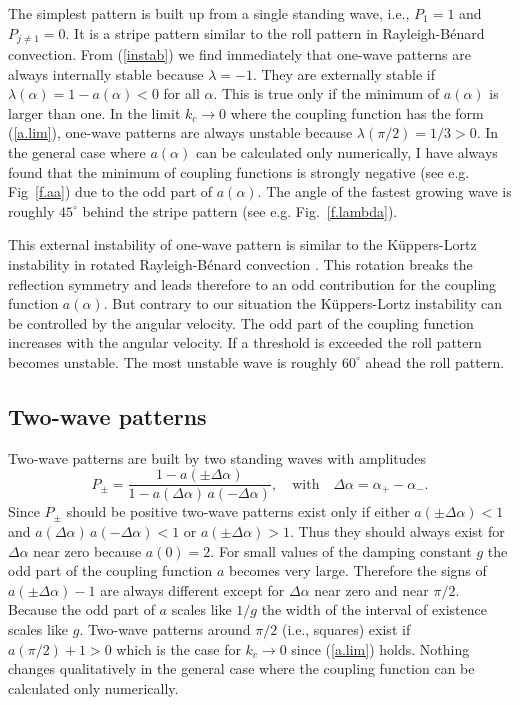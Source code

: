 The simplest pattern is built up from a single standing wave, i.e.,
$P_1=1$ and $P_{j\not=1}=0$. It is a stripe pattern similar to the
roll pattern in Rayleigh-B\'enard convection. From (\ref{instab}) we
find immediately that one-wave patterns are always internally stable 
because $\lambda=-1$. They are externally stable if
$\lambda(\alpha)=1-a(\alpha)<0$ for all $\alpha$. This is true only
if the minimum of $a(\alpha)$ is larger than one. In the limit
$k_c\to 0$ where the coupling function has the form (\ref{a.lim}),
one-wave patterns are always unstable because $\lambda(\pi/2)=1/3>0$.
In the general case where $a(\alpha)$ can be calculated only
numerically, I have always found that the minimum of coupling
functions is strongly negative (see e.g. Fig~\ref{f.aa}) due to the
odd part of $a(\alpha)$. The angle of the fastest growing wave is
roughly $45^\circ$ behind the stripe pattern (see e.g.
Fig.~\ref{f.lambda}).

This external instability of one-wave pattern is similar to the
K\"uppers-Lortz instability in rotated Rayleigh-B\'enard convection
\cite{kue.69}. This rotation breaks the reflection symmetry and
leads therefore to an odd contribution for the coupling function
$a(\alpha)$. But contrary to our situation the K\"uppers-Lortz
instability can be controlled by the angular velocity. The odd part
of the coupling function increases with the angular velocity. If a
threshold is exceeded the roll pattern becomes unstable. The most
unstable wave is roughly $60^\circ$ ahead the roll pattern.

\subsection{\protect\label{wave2}Two-wave patterns}

Two-wave patterns are built by two standing waves with amplitudes
\begin{equation}
  P_\pm=\frac{1-a(\pm\Delta\alpha)}{1-a(\Delta\alpha)\,a(-\Delta
   \alpha)},   \quad\mbox{with}\quad\Delta\alpha=\alpha_+-\alpha_-.
  \label{2wave}
\end{equation}
Since $P_\pm$ should be positive two-wave patterns exist only if
either $a(\pm\Delta\alpha)<1$ and $a(\Delta\alpha)\,
a(-\Delta\alpha)<1$ or $a(\pm\Delta\alpha)>1$. Thus they should
always exist for $\Delta\alpha$ near zero because $a(0)=2$. For small
values of the damping constant $g$ the odd part of the coupling
function $a$ becomes very large. Therefore the signs of
$a(\pm\Delta\alpha)-1$ are always different except for $\Delta\alpha$
near zero and near $\pi/2$. Because the odd part of $a$ scales like
$1/g$ the width of the interval of existence scales like $g$.
Two-wave patterns around $\pi/2$ (i.e., squares) exist if
$a(\pi/2)+1>0$ which is the case for $k_c\to 0$ since (\ref{a.lim})
holds. Nothing changes qualitatively in the general case where the
coupling function can be calculated only numerically.

